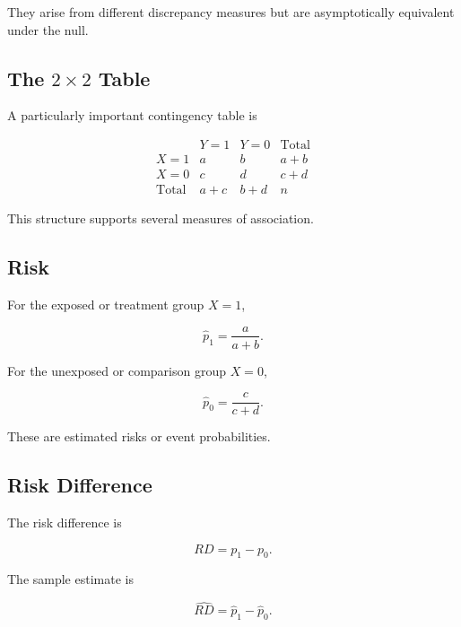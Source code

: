 They arise from different discrepancy measures but are asymptotically
equivalent under the null.

\subsection{The \(2\times2\) Table}
\label{subsec:two-by-two-table}

A particularly important contingency table is

\[
\begin{array}{c|cc|c}
&
Y=1
&
Y=0
&
\text{Total}
\\
\hline
X=1
&
a
&
b
&
a+b
\\
X=0
&
c
&
d
&
c+d
\\
\hline
\text{Total}
&
a+c
&
b+d
&
n
\end{array}
\]

This structure supports several measures of association.

\subsection{Risk}
\label{subsec:risk-categorical}

For the exposed or treatment group \(X=1\),

\[
\boxed{
\widehat{p}_1
=
\frac{
a
}{
a+b
}.
}
\]

For the unexposed or comparison group \(X=0\),

\[
\boxed{
\widehat{p}_0
=
\frac{
c
}{
c+d
}.
}
\]

These are estimated risks or event probabilities.

\subsection{Risk Difference}
\label{subsec:risk-difference}

The risk difference is

\[
\boxed{
RD
=
p_1-p_0.
}
\]

The sample estimate is

\[
\boxed{
\widehat{RD}
=
\widehat{p}_1-\widehat{p}_0.
}
\]


